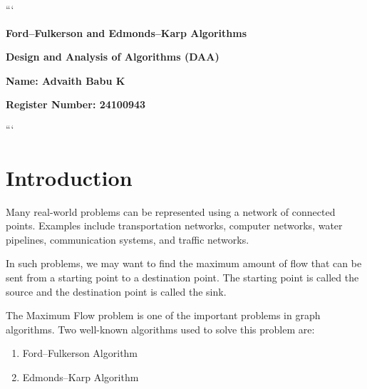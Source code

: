 \documentclass[12pt,a4paper]{article}
\begin{document}

\begin{titlepage}
\centering

```
\vspace*{5cm}

{\Huge\bfseries Ford--Fulkerson and Edmonds--Karp Algorithms\par}

\vspace{1.5cm}

{\Large\bfseries Design and Analysis of Algorithms (DAA)\par}

\vspace{1cm}

{\large\bfseries Name: Advaith Babu K\par}

\vspace{0.4cm}

{\large\bfseries Register Number: 24100943\par}

\vfill
```

\end{titlepage}


\section{Introduction}

Many real-world problems can be represented using a network of connected
points. Examples include transportation networks, computer networks,
water pipelines, communication systems, and traffic networks.

In such problems, we may want to find the maximum amount of flow that
can be sent from a starting point to a destination point. The starting
point is called the source and the destination point is called the sink.

The Maximum Flow problem is one of the important problems in graph
algorithms. Two well-known algorithms used to solve this problem are:

\begin{enumerate}
\item Ford--Fulkerson Algorithm
\item Edmonds--Karp Algorithm
\end{enumerate}
\end{document}
